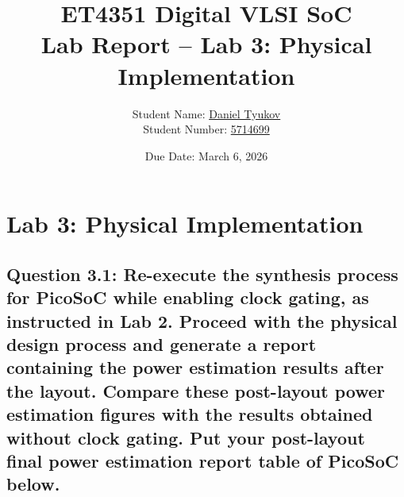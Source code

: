 \documentclass{article}
\title{
\vspace{-1.5cm}
\textcolor{tudelft}{\textbf{ET4351 Digital VLSI SoC \\ Lab Report -- Lab 3: Physical Implementation}}
\vspace{0.5cm}
}
\author{Student Name: \underline{\hspace{1cm}Daniel Tyukov\hspace{1cm}} \\Student Number: \underline{\hspace{1cm}5714699\hspace{1cm}}}
\date{Due Date: March 6, 2026}
\begin{document}
\maketitle
\thispagestyle{fancy}

\section{Lab 3: Physical Implementation}


\subsection*{Question 3.1: Re-execute the synthesis process for PicoSoC while enabling clock gating, as instructed in Lab 2. Proceed with the physical design process and generate a report containing the power estimation results after the layout. Compare these post-layout power estimation figures with the results obtained without clock gating. Put your post-layout final power estimation report table of PicoSoC below.}
\end{document}
